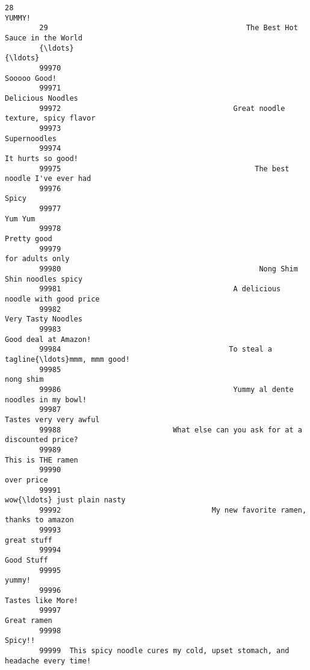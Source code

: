 \documentclass[11pt]{article}
\begin{document}
\begin{Verbatim}[commandchars=\\\{\}]
        28                                                                       YUMMY!   
        29                                              The Best Hot Sauce in the World   
        {\ldots}                                                                         {\ldots}   
        99970                                                              Sooooo Good!   
        99971                                                         Delicious Noodles   
        99972                                        Great noodle texture, spicy flavor   
        99973                                                              Supernoodles   
        99974                                                         It hurts so good!   
        99975                                             The best noodle I've ever had   
        99976                                                                     Spicy   
        99977                                                                   Yum Yum   
        99978                                                               Pretty good   
        99979                                                           for adults only   
        99980                                              Nong Shim Shin noodles spicy   
        99981                                        A delicious noodle with good price   
        99982                                                        Very Tasty Noodles   
        99983                                                      Good deal at Amazon!   
        99984                                       To steal a tagline{\ldots}mmm, mmm good!   
        99985                                                                 nong shim   
        99986                                        Yummy al dente noodles in my bowl!   
        99987                                                    Tastes very very awful   
        99988                          What else can you ask for at a discounted price?   
        99989                                                         This is THE ramen   
        99990                                                                over price   
        99991                                                   wow{\ldots} just plain nasty   
        99992                                   My new favorite ramen, thanks to amazon   
        99993                                                               great stuff   
        99994                                                                Good Stuff   
        99995                                                                    yummy!   
        99996                                                         Tastes like More!   
        99997                                                               Great ramen   
        99998                                                                   Spicy!!   
        99999  This spicy noodle cures my cold, upset stomach, and headache every time!   
        

\end{Verbatim}
\end{document}
